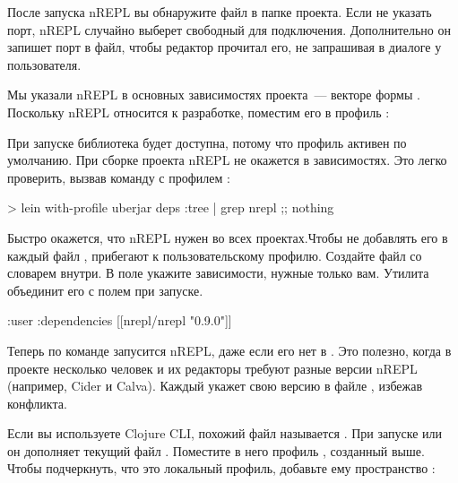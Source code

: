 После запуска nREPL вы обнаружите файл  в папке проекта. Если не указать порт, nREPL случайно выберет свободный для подключения. Дополнительно он запишет порт в файл, чтобы редактор прочитал его, не запрашивая в диалоге у пользователя.

Мы указали nREPL в основных зависимостях проекта~--- векторе  формы . Поскольку nREPL относится к разработке, поместим его в профиль :

\begin{english}
  \begin{clojure}
:profiles
{:dev
  {:dependencies
    [[nrepl/nrepl "0.9.0"]]}
  \end{clojure}
\end{english}

При запуске  библиотека будет доступна, потому что профиль  активен по умолчанию. При сборке проекта nREPL не окажется в зависимостях. Это легко проверить, вызвав команду  с профилем :

\begin{english}
  \begin{bash}
> lein with-profile uberjar deps :tree | grep nrepl
;; nothing
  \end{bash}
\end{english}

Быстро окажется, что nREPL нужен во всех проектах.Чтобы не добавлять его в каждый файл , прибегают к пользовательскому профилю. Создайте файл  со словарем внутри. В поле  укажите зависимости, нужные только вам. Утилита  объединит его с полем  при запуске.

\begin{english}
  \begin{clojure}
{:user
  {:dependencies
    [[nrepl/nrepl "0.9.0"]]}}
  \end{clojure}
\end{english}

Теперь по команде  запусится nREPL, даже если его нет в . Это полезно, когда в проекте несколько человек и их редакторы требуют разные версии nREPL (например, Cider и Calva). Каждый укажет свою версию в файле , избежав конфликта.

Если вы используете Clojure CLI, похожий файл называется . При запуске  или  он дополняет текущий файл . Поместите в него профиль , созданный выше. Чтобы подчеркнуть, что это локальный профиль, добавьте ему пространство :

